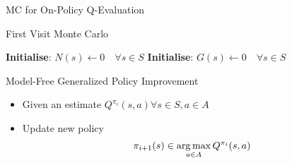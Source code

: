 \documentclass[aspectratio=169]{../latex_main/tntbeamer}  %
\begin{document}
\begin{frame}[c]{MC for On-Policy Q-Evaluation}
	
 \begin{algorithm}[H]
    \caption{First Visit Monte Carlo}
    \DontPrintSemicolon
    \LinesNotNumbered
    
    
    \textbf{Initialise}: $N(s) \gets 0 \quad \forall s \in S$ 
    \textbf{Initialise}: $G(s) \gets 0 \quad \forall s \in S$ 
\end{algorithm}
	
\end{frame}
\begin{frame}[c]{Model-Free Generalized Policy Improvement}
	
	\begin{itemize}
		\item Given an estimate $Q^{\pi_i}(s,a) \forall s\in S, a \in A$
		\item Update new policy
		$$\pi_{i+1}(s) \in \operatorname*{arg\,max}_{a \in A} Q^{\pi_i} (s,a) $$
	\end{itemize}
	
\end{frame}
\end{document}
